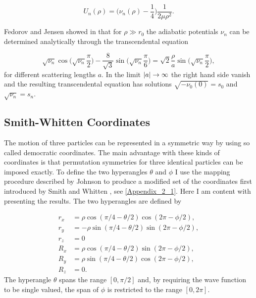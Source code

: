 \begin{equation}\label{eq:faddeev_effectivepot}
U_{n}(\rho) = \Big(\nu_n(\rho)-\frac{1}{4}\Big)\frac{1}{2 \mu \rho^2}.
\end{equation}

Fedorov and Jensen showed in \cite{Fedorov1993} that for $\rho \gg r_0$ the adiabatic potentials $\nu_n$ can be determined analytically through the transcendental equation

\begin{equation}\label{eq:transcendental}
\sqrt{\nu_n} \cos{\bigg(\sqrt{\nu_n} \frac{\pi}{2}\bigg)} - \frac{8}{\sqrt{3}}\sin{\bigg(\sqrt{\nu_n} \frac{\pi}{6}\bigg)} = \sqrt{2}\frac{\rho}{a}\sin{\bigg(\sqrt{\nu_n} \frac{\pi}{2}\bigg)}, 
\end{equation}
for different scattering lengths $a$. In the limit $\lvert a\rvert \rightarrow \infty$ the right hand side vanish and the resulting transcendental equation has solutions $\sqrt{-\nu_0(0)}=s_0$ and $\sqrt{\nu_n}=s_n$.
\subsection{Smith-Whitten Coordinates}\label{smith_whitten}
The motion of three particles can be represented in a symmetric way by using so called democratic coordinates. The main advantage with these kinds of coordinates is that permutation symmetries for three identical particles can be imposed exactly. To define the two hyperangles $\theta$ and $\phi$ I use the mapping procedure described by Johnson \cite{Johnson1980} to produce a modified set of the coordinates first introduced by Smith and Whitten \cite{Smith_Whitten1968}, see \cref{Appendix_2_1}. Here I am content with presenting the results. The two hyperangles are defined by

\begin{equation}
\begin{aligned}
r_x &= \rho \cos(\pi/4-\theta/2)\cos(2\pi - \phi/2),\\
r_y &= -\rho \sin(\pi/4-\theta/2)\sin(2\pi - \phi/2),\\
r_z &= 0\\
R_x &= \rho \cos(\pi/4-\theta/2)\sin(2\pi - \phi/2),\\
R_y &= \rho \sin(\pi/4-\theta/2)\cos(2\pi - \phi/2),\\
R_z &= 0.
\end{aligned}   
\end{equation}
The hyperangle $\theta$ spans the range $[0,\pi/2]$ and, by requiring the wave function to be single valued, the span of $\phi$ is restricted to the range $[0,2\pi]$. 

